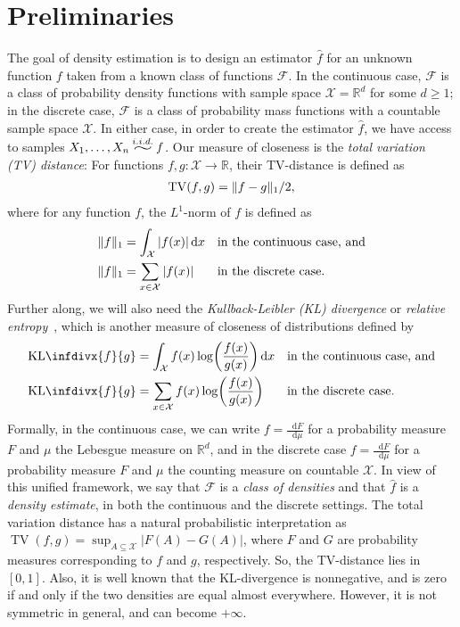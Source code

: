 \documentclass[letterpaper]{amsart}
\newcommand{\infdiv}{\mathrm{KL}\infdivx}
\DeclarePairedDelimiter{\norm}{\lVert}{\rVert}
\newcommand{\sX}{\mathcal{X}}
\newcommand{\sF}{\mathcal{F}}
\newcommand{\R}{\mathbb{R}}
\DeclareMathOperator{\TV}{TV}
\newcommand{\widesim}[2][1.5]{
  \mathrel{\overset{#2}{\scalebox{#1}[1]{$\sim$}}}
}
\newcommand{\iid}{\mathbin{\widesim[2]{i.i.d.}}}
\let\originalleft\left
\let\originalright\right
\def\left#1{\mathopen{}\originalleft#1}
\def\right#1{\originalright#1\mathclose{}}
\newcommand{\dif}{\mathop{}\!\mathrm{d}}
\newcommand{\seclabel}[1]{\label{sec:#1}}
\numberwithin{thm}{section}
\theoremstyle{definition}
\theoremstyle{plain}
\begin{document}
\section{Preliminaries}\seclabel{prelim}
The goal of density estimation is to design an estimator $\hat{f}$ for
an unknown function $f$ taken from a known class of functions
$\sF$. In the continuous case, $\sF$ is a class of probability density
functions with sample space $\sX = \R^d$ for some $d \ge 1$; in the
discrete case, $\sF$ is a class of probability mass functions with a
countable sample space $\sX$. In either case, in order to create the
estimator $\hat{f}$, we have access to samples
$X_1, \dots, X_n \iid f$. Our measure of closeness is the \emph{total
  variation (TV) distance}: For functions $f, g : \sX \to \R$, their
TV-distance is defined as
\begin{align*}
  \TV(f, g) =  \norm{f - g}_1 /2,
\end{align*}
where for any function $f$, the $L^1$-norm of $f$  is defined as
\begin{align*}
  \norm{f}_1 &= \int_{\sX} |f(x)| \dif x &&\textrm{in the continuous case, and} \\
  \norm{f}_1 &= \sum_{x \in \sX} |f(x)| &&\textrm{in the discrete case. }
\end{align*}
Further along, we will also need the \emph{Kullback-Leibler (KL)
  divergence} or \emph{relative entropy}~\cite{kullback-book}, which
is another measure of closeness of distributions defined by
\begin{align*}
  \infdiv{f}{g} &= \int_{\sX} f(x) \log\left( \frac{f(x)}{g(x)} \right) \dif x &&\textrm{in the continuous case, and} \\
  \infdiv{f}{g} &= \sum_{x \in \sX} f(x) \log \left( \frac{f(x)}{g(x)} \right) &&\textrm{in the discrete case.}
\end{align*}
Formally, in the continuous case, we can write
$f = \frac{\dif F}{\dif \mu}$ for a probability measure $F$ and $\mu$
the Lebesgue measure on $\R^d$, and in the discrete case
$f = \frac{\dif F}{\dif \mu}$ for a probability measure $F$ and $\mu$
the counting measure on countable $\sX$. In view of this unified
framework, we say that $\sF$ is a \emph{class of densities} and that
$\hat{f}$ is a \emph{density estimate}, in both the continuous and the
discrete settings.  The total variation distance has a natural
probabilistic interpretation as
$\TV(f, g) = \sup_{A\subseteq \sX} |F(A)-G(A)|$, where $F$ and $G$ are
probability measures corresponding to $f$ and $g$, respectively. So,
the TV-distance lies in $[0,1]$.  Also, it is well known that the
KL-divergence is nonnegative, and is zero if and only if the two
densities are equal almost everywhere.  However, it is not symmetric
in general, and can become $+\infty$.
\end{document}
